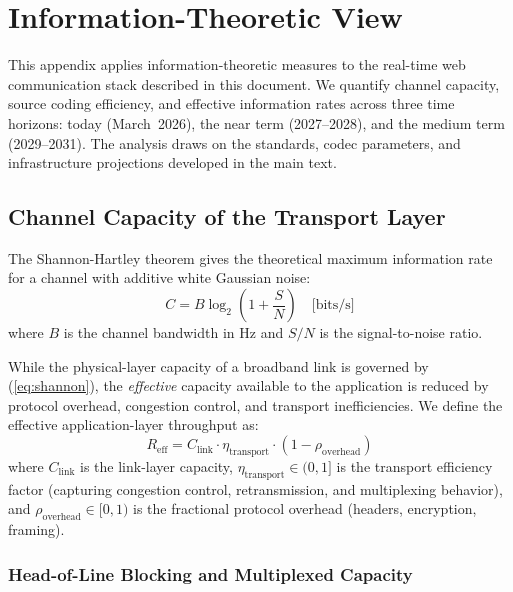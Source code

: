 %   
%

\section{Information-Theoretic View}
\label{app:info-theory}

This appendix applies information-theoretic measures to the real-time
web communication stack described in this document. We quantify channel
capacity, source coding efficiency, and effective information rates
across three time horizons: today (March~2026), the near term
(2027--2028), and the medium term (2029--2031). The analysis draws on
the standards, codec parameters, and infrastructure projections
developed in the main text.

\subsection{Channel Capacity of the Transport Layer}

The Shannon-Hartley theorem gives the theoretical maximum information
rate for a channel with additive white Gaussian noise:
\begin{equation}
  C = B \log_2\!\left(1 + \frac{S}{N}\right) \quad \text{[bits/s]}
  \label{eq:shannon}
\end{equation}
where $B$ is the channel bandwidth in Hz and $S/N$ is the
signal-to-noise ratio.

While the physical-layer capacity of a broadband link is governed by
(\ref{eq:shannon}), the \emph{effective} capacity available to the
application is reduced by protocol overhead, congestion control, and
transport inefficiencies. We define the effective application-layer
throughput as:
\begin{equation}
  R_{\text{eff}} = C_{\text{link}} \cdot \eta_{\text{transport}}
    \cdot (1 - \rho_{\text{overhead}})
  \label{eq:reff}
\end{equation}
where $C_{\text{link}}$ is the link-layer capacity,
$\eta_{\text{transport}} \in (0,1]$ is the transport efficiency factor
(capturing congestion control, retransmission, and multiplexing
behavior), and $\rho_{\text{overhead}} \in [0,1)$ is the fractional
protocol overhead (headers, encryption, framing).

\subsubsection{Head-of-Line Blocking and Multiplexed Capacity}

